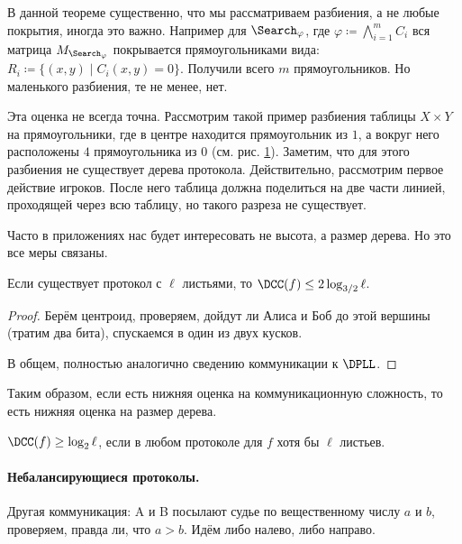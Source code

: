В данной теореме существенно, что мы рассматриваем разбиения, а не любые покрытия, иногда это
важно. Например для $\Search_{\varphi}$, где $\varphi \coloneqq \bigwedge\limits_{i = 1}^{m} C_i$ вся
матрица $M_{\Search_{\varphi}}$ покрывается прямоугольниками вида: $R_i \coloneqq \{(x, y) \mid C_i(x, y)
= 0\}$. Получили всего $m$ прямоугольников. Но маленького разбиения, те не менее, нет.


Эта оценка не всегда точна. Рассмотрим такой пример разбиения таблицы $X \times Y$ на прямоугольники, где в
центре находится прямоугольник из $1$, а вокруг него расположены $4$ прямоугольника из $0$
(см. рис. \ref{fig:partition-rect}). Заметим, что для этого разбиения не существует дерева
протокола. Действительно, рассмотрим первое действие игроков. После него таблица должна поделиться на две
части линией, проходящей через всю таблицу, но такого разреза не существует.
\begin{figure}[h]
 	\centering
    
 	\caption{}
 	\label{fig:partition-rect}
\end{figure}


Часто в приложениях нас будет интересовать не высота, а размер дерева. Но это все меры связаны.
\begin{theorem}[Балансировка]
    Если существует протокол с $\ell$ листьями, то $\DCC(f) \le 2 \log_{3 / 2} \ell$.
\end{theorem}

\begin{proof}
    Берём центроид, проверяем, дойдут ли Алиса и Боб до этой вершины (тратим два бита), спускаемся в один
    из двух кусков.

    В общем, полностью аналогично сведению коммуникации к $\DPLL$.
\end{proof}

Таким образом, если есть нижняя оценка на коммуникационную сложность, то есть нижняя оценка на размер
дерева.

\begin{remark}
    $\DCC(f) \ge \log_2 \ell$, если в любом протоколе для $f$ хотя бы $\ell$ листьев.
\end{remark}


\paragraph{Небалансирующиеся протоколы.}
Другая коммуникация: A и B посылают судье по вещественному числу $a$ и $b$, проверяем, правда ли, что $a
> b$. Идём либо налево, либо направо.


